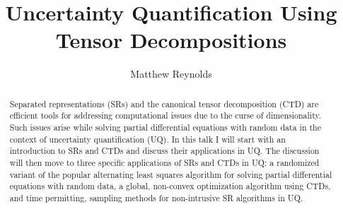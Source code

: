 \documentclass[11pt]{amsart}
\title{Uncertainty Quantification Using Tensor Decompositions}
\author{Matthew Reynolds}
\begin{document}
\maketitle
\begin{abstract}
Separated representations (SRs) and the canonical tensor decomposition (CTD) are efficient tools for addressing computational issues due to the curse of dimensionality. Such issues arise while solving partial differential equations with random data in the context of uncertainty quantification (UQ). In this talk I will start with an introduction to SRs and CTDs and discuss their applications in UQ.  The discussion will then move to three specific applications of SRs and CTDs in UQ: a randomized variant of the popular alternating least squares algorithm for solving partial differential equations with random data, a global, non-convex optimization algorithm using CTDs, and time permitting, sampling methods for non-intrusive SR algorithms in UQ. 
  
\end{abstract}
\end{document}

